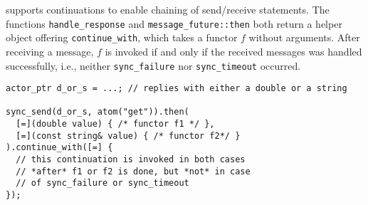 \libcppa supports continuations to enable chaining of send/receive statements.
The functions \lstinline^handle_response^ and \lstinline^message_future::then^ both return a helper object offering \lstinline^continue_with^, which takes a functor $f$ without arguments.
After receiving a message, $f$ is invoked if and only if the received messages was handled successfully, i.e., neither \lstinline^sync_failure^ nor \lstinline^sync_timeout^ occurred.

\begin{lstlisting}
actor_ptr d_or_s = ...; // replies with either a double or a string

sync_send(d_or_s, atom("get")).then(
  [=](double value) { /* functor f1 */ },
  [=](const string& value) { /* functor f2*/ }
).continue_with([=] {
  // this continuation is invoked in both cases
  // *after* f1 or f2 is done, but *not* in case
  // of sync_failure or sync_timeout
});
\end{lstlisting}
